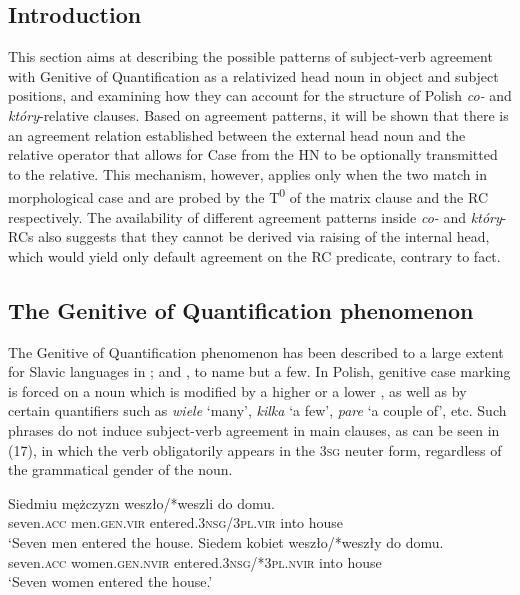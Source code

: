 \documentclass[output=paper]{langsci/langscibook}
\begin{document}
\subsection{Introduction}%

This section aims at describing the possible patterns of subject-verb agreement with Genitive of Quantification as a relativized head noun in object and subject positions, and examining how they can account for the structure of Polish \textit{co{}-} and \textit{który}{}-relative clauses. Based on agreement patterns, it will be shown that there is an agreement relation established between the external head noun and the relative operator that allows for Case from the HN to be optionally transmitted to the relative. This mechanism, however, applies only when the two match in morphological case and are probed by the T\textsuperscript{0} of the matrix clause and the RC respectively. The availability of different agreement patterns inside \textit{co{}-} and \textit{który}{}-RCs also suggests that they cannot be derived via raising of the internal head, which would yield only default agreement on the RC predicate, contrary to fact. 

\subsection{The Genitive of Quantification phenomenon}%

The Genitive of Quantification phenomenon has been described to a large extent for Slavic languages in \citet{Bošković2006,Franks1994,Franks2002,Przepiórkowski2004,Rutkowski2002}; and \citet{Willim2003}, to name but a few. In Polish, genitive case marking is forced on a noun which is modified by a higher  or a lower  , as well as by certain quantifiers such as \textit{wiele} ‘many’, \textit{kilka} ‘a few’, \textit{pare} ‘a couple of’, etc. Such  phrases do not induce subject-verb agreement in main clauses, as can be seen in (17), in which the verb obligatorily appears in the \textsc{3sg} neuter form, regardless of the grammatical gender of the noun. 

\ea%
    \label{ex:leska:17}
    \ea
    \gll Siedmiu   mężczyzn   weszło/*weszli   do   domu.\\
         seven.\textsc{acc}   men.\textsc{gen.vir}   entered.\textsc{3nsg/3pl.vir} into   house\\
    \glt ‘Seven men entered the house.
    \ex
    \gll Siedem   kobiet   weszło/*weszły      do domu.\\
         seven.\textsc{acc}   women.\textsc{gen.nvir}   entered.\textsc{3nsg/*3pl.nvir} into house\\
    \glt ‘Seven women entered the house.’
    \z
\z
    
\end{document}
